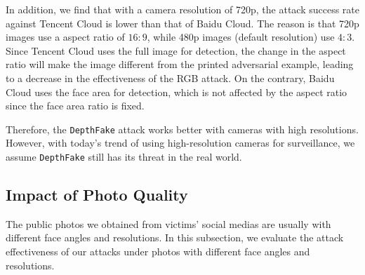 In addition, we find that with a camera resolution of 720p, the attack success rate against Tencent Cloud is lower than that of Baidu Cloud. The reason is that 720p images use a aspect ratio of $16:9$, while 480p images (default resolution) use $4:3$. Since Tencent Cloud uses the full image  for detection, the change in the aspect ratio will make the image different from the printed adversarial example, leading to a decrease in the effectiveness of the RGB attack. On the contrary, Baidu Cloud uses the face area for detection, which is not affected by the aspect ratio since the face area ratio is fixed.

Therefore, the \texttt{DepthFake} attack works better with cameras with high resolutions. However, with today's trend of using high-resolution cameras for surveillance, we assume \texttt{DepthFake}  still has its threat in the real world.


\subsection{Impact of Photo Quality}
The public photos we obtained from victims' social medias are usually with different face angles and resolutions. In this subsection, we evaluate the attack effectiveness of our attacks under photos with different face angles and resolutions.



